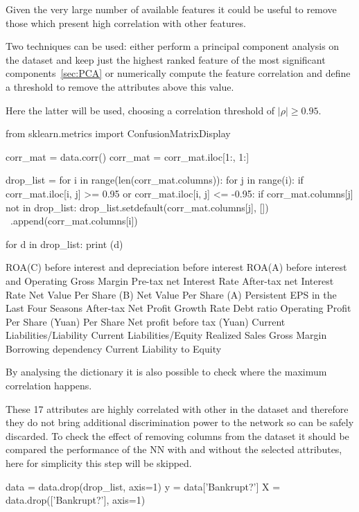 Given the very large number of available features it could be useful to remove those which present high correlation with other features.

Two techniques can be used: either perform a principal component analysis on the dataset and keep just the highest ranked feature of the most significant components~\ref{sec:PCA} or numerically compute the feature correlation and define a threshold to remove the attributes above this value.

Here the latter will be used, choosing a correlation threshold of $|\rho|\geq 0.95$.

\begin{ipython}
from sklearn.metrics import ConfusionMatrixDisplay

corr_mat = data.corr()
corr_mat = corr_mat.iloc[1:, 1:]

drop_list = {}
for i in range(len(corr_mat.columns)):
    for j in range(i):
        if corr_mat.iloc[i, j] >= 0.95 or corr_mat.iloc[i, j] <= -0.95:
            if corr_mat.columns[j] not in drop_list:
                drop_list.setdefault(corr_mat.columns[j], []) \
                         .append(corr_mat.columns[i])
                
for d in drop_list:
    print (d)
\end{ipython}
\begin{ioutput}
ROA(C) before interest and depreciation before interest
ROA(A) before interest and %
Operating Gross Margin
Pre-tax net Interest Rate
After-tax net Interest Rate
Net Value Per Share (B)
Net Value Per Share (A)
Persistent EPS in the Last Four Seasons
After-tax Net Profit Growth Rate
Debt ratio %
Operating Profit Per Share (Yuan)
Per Share Net profit before tax (Yuan)
Current Liabilities/Liability
Current Liabilities/Equity
Realized Sales Gross Margin
Borrowing dependency
Current Liability to Equity
\end{ioutput}
\noindent 
By analysing the dictionary it is also possible to check where the maximum correlation happens.

These 17 attributes are highly correlated with other in the dataset and therefore they do not bring additional discrimination power to the network so can be safely discarded. To check the effect of removing columns from the dataset it should be compared the performance of the NN with and without the selected attributes, here for simplicity this step will be skipped.

\begin{ipython}
data = data.drop(drop_list, axis=1)
y = data['Bankrupt?']
X = data.drop(['Bankrupt?'], axis=1)
\end{ipython}

